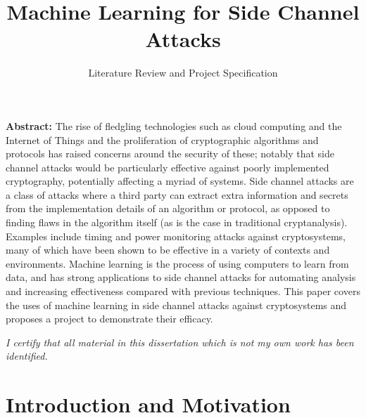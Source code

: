 \documentclass[a4paper,oneside,11pt]{article}
\begin{document}


\title{Machine Learning for Side Channel Attacks}
\author{Literature Review and Project Specification}
\date{}

\maketitle

\textbf{Abstract:} The rise of fledgling technologies such as cloud computing
and the Internet of Things and the proliferation of cryptographic algorithms
and protocols has raised concerns around the security of these; notably that
side channel attacks would be particularly effective against poorly implemented
cryptography, potentially affecting a myriad of systems. Side channel attacks
are a class of attacks where a third party can extract extra information and
secrets from the implementation details of an algorithm or protocol, as opposed
to finding flaws in the algorithm itself (as is the case in traditional
cryptanalysis). Examples include timing and power monitoring attacks against
cryptosystems, many of which have been shown to be effective in a variety of
contexts and environments. Machine learning is the process of using computers
to learn from data, and has strong applications to side channel attacks for
automating analysis and increasing effectiveness compared with previous
techniques. This paper covers the uses of machine learning in side channel
attacks against cryptosystems and proposes a project to demonstrate their
efficacy.

\vspace*{\fill}

\begin{center}
	\textit{I certify that all material in this dissertation which is not
	my own work has been identified.}
\end{center}

\thispagestyle{empty}
\setcounter{page}{0}

\newpage



\section{Introduction and Motivation}
\label{sec:introduction-and-motivation}
\end{document}
